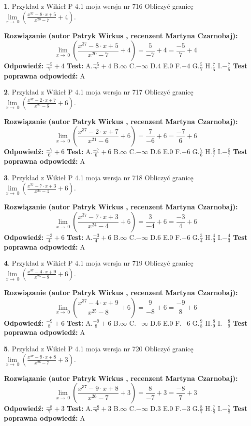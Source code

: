 \documentclass[12pt, a4paper]{article}
\theoremstyle{definition} %
\newtheorem{zad}{}
\newcommand{\zadStart}[1]{\begin{zad}#1\newline}
\newcommand{\zadStop}{\end{zad}}
\newcommand{\rozwStart}[2]{\noindent \textbf{Rozwiązanie (autor #1 , recenzent #2): }\newline}
\newcommand{\rozwStop}{\newline}
\newcommand{\odpStart}{\noindent \textbf{Odpowiedź:}\newline}
\newcommand{\odpStop}{\newline}
\newcommand{\testStart}{\noindent \textbf{Test:}\newline}
\newcommand{\testStop}{\newline}
\newcommand{\kluczStart}{\noindent \textbf{Test poprawna odpowiedź:}\newline}
\newcommand{\kluczStop}{\newline}
\begin{document}
\zadStart{Przykład z Wikieł P 4.1 moja wersja nr 716}
Obliczyć granicę $\lim\limits_{x\to\ 0}(\frac{x^{37}-8 \cdot x +5}{x^{20}-7}+4)$.
\zadStop
\rozwStart{Patryk Wirkus}{Martyna Czarnobaj}
$$\lim\limits_{x\to\ 0}(\frac{x^{37}-8 \cdot x +5}{x^{20}-7}+4)=\frac{5}{-7}+4=\frac{-5}{7}+4$$
\rozwStop
\odpStart
$\frac{-5}{7}+4$
\odpStop
\testStart
A.$\frac{-5}{7}+4$
B.$\infty$
C.$-\infty$
D.$4$
E.$0$
F.$-4$
G.$\frac{5}{7}$
H.$\frac{7}{5}$
I.$-\frac{7}{5}$
\testStop
\kluczStart
A
\kluczStop



\zadStart{Przykład z Wikieł P 4.1 moja wersja nr 717}
Obliczyć granicę $\lim\limits_{x\to\ 0}(\frac{x^{37}-2 \cdot x +7}{x^{21}-6}+6)$.
\zadStop
\rozwStart{Patryk Wirkus}{Martyna Czarnobaj}
$$\lim\limits_{x\to\ 0}(\frac{x^{37}-2 \cdot x +7}{x^{21}-6}+6)=\frac{7}{-6}+6=\frac{-7}{6}+6$$
\rozwStop
\odpStart
$\frac{-7}{6}+6$
\odpStop
\testStart
A.$\frac{-7}{6}+6$
B.$\infty$
C.$-\infty$
D.$6$
E.$0$
F.$-6$
G.$\frac{7}{6}$
H.$\frac{6}{7}$
I.$-\frac{6}{7}$
\testStop
\kluczStart
A
\kluczStop



\zadStart{Przykład z Wikieł P 4.1 moja wersja nr 718}
Obliczyć granicę $\lim\limits_{x\to\ 0}(\frac{x^{37}-7 \cdot x +3}{x^{24}-4}+6)$.
\zadStop
\rozwStart{Patryk Wirkus}{Martyna Czarnobaj}
$$\lim\limits_{x\to\ 0}(\frac{x^{37}-7 \cdot x +3}{x^{24}-4}+6)=\frac{3}{-4}+6=\frac{-3}{4}+6$$
\rozwStop
\odpStart
$\frac{-3}{4}+6$
\odpStop
\testStart
A.$\frac{-3}{4}+6$
B.$\infty$
C.$-\infty$
D.$6$
E.$0$
F.$-6$
G.$\frac{3}{4}$
H.$\frac{4}{3}$
I.$-\frac{4}{3}$
\testStop
\kluczStart
A
\kluczStop



\zadStart{Przykład z Wikieł P 4.1 moja wersja nr 719}
Obliczyć granicę $\lim\limits_{x\to\ 0}(\frac{x^{37}-4 \cdot x +9}{x^{25}-8}+6)$.
\zadStop
\rozwStart{Patryk Wirkus}{Martyna Czarnobaj}
$$\lim\limits_{x\to\ 0}(\frac{x^{37}-4 \cdot x +9}{x^{25}-8}+6)=\frac{9}{-8}+6=\frac{-9}{8}+6$$
\rozwStop
\odpStart
$\frac{-9}{8}+6$
\odpStop
\testStart
A.$\frac{-9}{8}+6$
B.$\infty$
C.$-\infty$
D.$6$
E.$0$
F.$-6$
G.$\frac{9}{8}$
H.$\frac{8}{9}$
I.$-\frac{8}{9}$
\testStop
\kluczStart
A
\kluczStop



\zadStart{Przykład z Wikieł P 4.1 moja wersja nr 720}
Obliczyć granicę $\lim\limits_{x\to\ 0}(\frac{x^{37}-9 \cdot x +8}{x^{26}-7}+3)$.
\zadStop
\rozwStart{Patryk Wirkus}{Martyna Czarnobaj}
$$\lim\limits_{x\to\ 0}(\frac{x^{37}-9 \cdot x +8}{x^{26}-7}+3)=\frac{8}{-7}+3=\frac{-8}{7}+3$$
\rozwStop
\odpStart
$\frac{-8}{7}+3$
\odpStop
\testStart
A.$\frac{-8}{7}+3$
B.$\infty$
C.$-\infty$
D.$3$
E.$0$
F.$-3$
G.$\frac{8}{7}$
H.$\frac{7}{8}$
I.$-\frac{7}{8}$
\testStop
\kluczStart
A
\kluczStop
\end{document}
